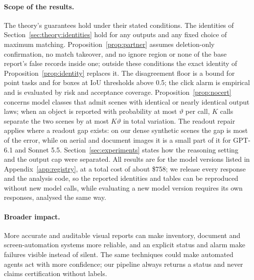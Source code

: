 \paragraph{Scope of the results.} The theory's guarantees hold under their stated conditions. The identities of Section~\ref{sec:theory:identities} hold for any outputs and any fixed choice of maximum matching. Proposition~\ref{prop:partner} assumes deletion-only confirmation, no match takeover, and no ignore region or none of the base report's false records inside one; outside these conditions the exact identity of Proposition~\ref{prop:identity} replaces it. The disagreement floor is a bound for point tasks and for boxes at IoU thresholds above 0.5; the click alarm is empirical and is evaluated by risk and acceptance coverage. Proposition~\ref{prop:nocert} concerns model classes that admit scenes with identical or nearly identical output laws; when an object is reported with probability at most $\vartheta$ per call, $K$ calls separate the two scenes by at most $K\vartheta$ in total variation. The readout repair applies where a readout gap exists: on our dense synthetic scenes the gap is most of the error, while on aerial and document images it is a small part of it for GPT-6.1 and Sonnet 5.5. Section~\ref{sec:experiments} states how the reasoning setting and the output cap were separated. All results are for the model versions listed in Appendix~\ref{app:registry}, at a total cost of about \$758; we release every response and the analysis code, so the reported identities and tables can be reproduced without new model calls, while evaluating a new model version requires its own responses, analysed the same way.

\paragraph{Broader impact.} More accurate and auditable visual reports can make inventory, document and screen-automation systems more reliable, and an explicit status and alarm make failures visible instead of silent. The same techniques could make automated agents act with more confidence; our pipeline always returns a status and never claims certification without labels.
